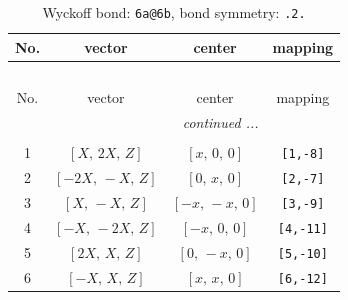 \documentclass[fleqn,8pt]{jsarticle}
\begin{document}
\begin{longtable}{cccc}
\caption{Wyckoff bond: {\tt 6a@6b}, bond symmetry: {\tt .2.}}
 \\
 \hline \hline
No. & vector & center & mapping \\ \hline \endfirsthead

\multicolumn{3}{l}{\tablename\ \thetable{}} \\
 \hline \hline
No. & vector & center & mapping \\ \hline \endhead

 \hline \hline
\multicolumn{3}{r}{\footnotesize\it continued ...} \\ \endfoot

 \hline \hline
\multicolumn{3}{r}{} \\ \endlastfoot

1 & $\left[ X,\, 2 X,\, Z \right]$ & $\left[ x,\, 0,\, 0 \right]$ & {\tt [1,-8]} \\ \hline
2 & $\left[ - 2 X,\, - X,\, Z \right]$ & $\left[ 0,\, x,\, 0 \right]$ & {\tt [2,-7]} \\ \hline
3 & $\left[ X,\, - X,\, Z \right]$ & $\left[ - x,\, - x,\, 0 \right]$ & {\tt [3,-9]} \\ \hline
4 & $\left[ - X,\, - 2 X,\, Z \right]$ & $\left[ - x,\, 0,\, 0 \right]$ & {\tt [4,-11]} \\ \hline
5 & $\left[ 2 X,\, X,\, Z \right]$ & $\left[ 0,\, - x,\, 0 \right]$ & {\tt [5,-10]} \\ \hline
6 & $\left[ - X,\, X,\, Z \right]$ & $\left[ x,\, x,\, 0 \right]$ & {\tt [6,-12]} \\
\end{longtable}
\renewcommand{\arraystretch}{1.2}
\end{document}
